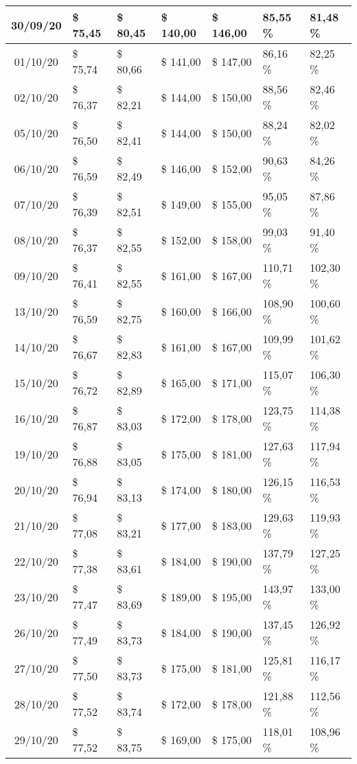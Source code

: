 \begin{center}
\begin{longtable}{|c|p{1.5cm}|p{1.5cm}|p{1.5cm}|p{1.5cm}|p{1.5cm}|p{1.5cm}|}
30/09/20 & \$ 75,45 & \$ 80,45 & \$ 140,00 & \$ 146,00 & 85,55 \% & 81,48 \% \\ \hline
01/10/20 & \$ 75,74 & \$ 80,66 & \$ 141,00 & \$ 147,00 & 86,16 \% & 82,25 \% \\ \hline
02/10/20 & \$ 76,37 & \$ 82,21 & \$ 144,00 & \$ 150,00 & 88,56 \% & 82,46 \% \\ \hline
05/10/20 & \$ 76,50 & \$ 82,41 & \$ 144,00 & \$ 150,00 & 88,24 \% & 82,02 \% \\ \hline
06/10/20 & \$ 76,59 & \$ 82,49 & \$ 146,00 & \$ 152,00 & 90,63 \% & 84,26 \% \\ \hline
07/10/20 & \$ 76,39 & \$ 82,51 & \$ 149,00 & \$ 155,00 & 95,05 \% & 87,86 \% \\ \hline
08/10/20 & \$ 76,37 & \$ 82,55 & \$ 152,00 & \$ 158,00 & 99,03 \% & 91,40 \% \\ \hline
09/10/20 & \$ 76,41 & \$ 82,55 & \$ 161,00 & \$ 167,00 & 110,71 \% & 102,30 \% \\ \hline
13/10/20 & \$ 76,59 & \$ 82,75 & \$ 160,00 & \$ 166,00 & 108,90 \% & 100,60 \% \\ \hline
14/10/20 & \$ 76,67 & \$ 82,83 & \$ 161,00 & \$ 167,00 & 109,99 \% & 101,62 \% \\ \hline
15/10/20 & \$ 76,72 & \$ 82,89 & \$ 165,00 & \$ 171,00 & 115,07 \% & 106,30 \% \\ \hline
16/10/20 & \$ 76,87 & \$ 83,03 & \$ 172,00 & \$ 178,00 & 123,75 \% & 114,38 \% \\ \hline
19/10/20 & \$ 76,88 & \$ 83,05 & \$ 175,00 & \$ 181,00 & 127,63 \% & 117,94 \% \\ \hline
20/10/20 & \$ 76,94 & \$ 83,13 & \$ 174,00 & \$ 180,00 & 126,15 \% & 116,53 \% \\ \hline
21/10/20 & \$ 77,08 & \$ 83,21 & \$ 177,00 & \$ 183,00 & 129,63 \% & 119,93 \% \\ \hline
22/10/20 & \$ 77,38 & \$ 83,61 & \$ 184,00 & \$ 190,00 & 137,79 \% & 127,25 \% \\ \hline
23/10/20 & \$ 77,47 & \$ 83,69 & \$ 189,00 & \$ 195,00 & 143,97 \% & 133,00 \% \\ \hline
26/10/20 & \$ 77,49 & \$ 83,73 & \$ 184,00 & \$ 190,00 & 137,45 \% & 126,92 \% \\ \hline
27/10/20 & \$ 77,50 & \$ 83,73 & \$ 175,00 & \$ 181,00 & 125,81 \% & 116,17 \% \\ \hline
28/10/20 & \$ 77,52 & \$ 83,74 & \$ 172,00 & \$ 178,00 & 121,88 \% & 112,56 \% \\ \hline
29/10/20 & \$ 77,52 & \$ 83,75 & \$ 169,00 & \$ 175,00 & 118,01 \% & 108,96 \% \\ \hline

\end{longtable}
\end{center}
